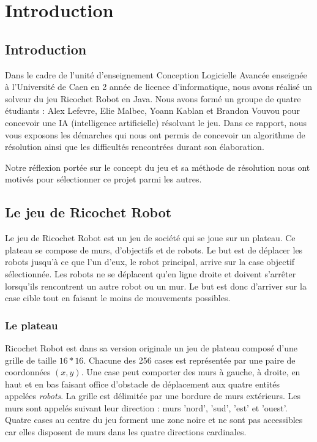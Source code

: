 \documentclass[a4paper]{article} %
\begin{document}
\section{Introduction}
	\subsection{Introduction}
Dans le cadre de l'unité d'enseignement Conception Logicielle Avancée enseignée à l'Université de Caen en 2 année de licence d'informatique, nous avons réalisé un solveur du jeu Ricochet Robot en Java. Nous avons formé un groupe de quatre étudiants : Alex Lefevre, Elie Malbec, Yoann Kablan et Brandon Vouvou pour concevoir une IA (intelligence artificielle) résolvant le jeu. Dans ce rapport, nous vous exposons les démarches qui nous ont permis de concevoir un algorithme de résolution ainsi que les difficultés rencontrées durant son élaboration.

Notre réflexion portée sur le concept du jeu et sa méthode de résolution nous ont motivés pour sélectionner ce projet parmi les autres.%


	\subsection{Le jeu de Ricochet Robot}
Le jeu de Ricochet Robot est un jeu de société qui se joue sur un plateau. Ce plateau se compose de murs, d'objectifs et de robots. Le but est de déplacer les robots jusqu'à ce que l'un d'eux, le robot principal, arrive sur la case objectif sélectionnée. Les robots ne se déplacent qu'en ligne droite et doivent s'arrêter lorsqu'ils rencontrent un autre robot ou un mur. Le but est donc d'arriver sur la case cible tout en faisant le moins de mouvements possibles.
			\subsubsection{Le plateau}
Ricochet Robot est dans sa version originale un jeu de plateau composé d'une grille de taille $16*16$. Chacune des 256 cases est représentée par une paire de coordonnées $(x,y)$. Une case peut comporter des murs à gauche, à droite, en haut et en bas faisant office d'obstacle de déplacement aux quatre entités appelées \textit{robots}. La grille est délimitée par une bordure de murs extérieurs. Les murs sont appelés suivant leur direction : murs 'nord', 'sud', 'est' et 'ouest'. Quatre cases au centre du jeu forment une zone noire et ne sont pas accessibles car elles disposent de murs dans les quatre directions cardinales.
\end{document}
